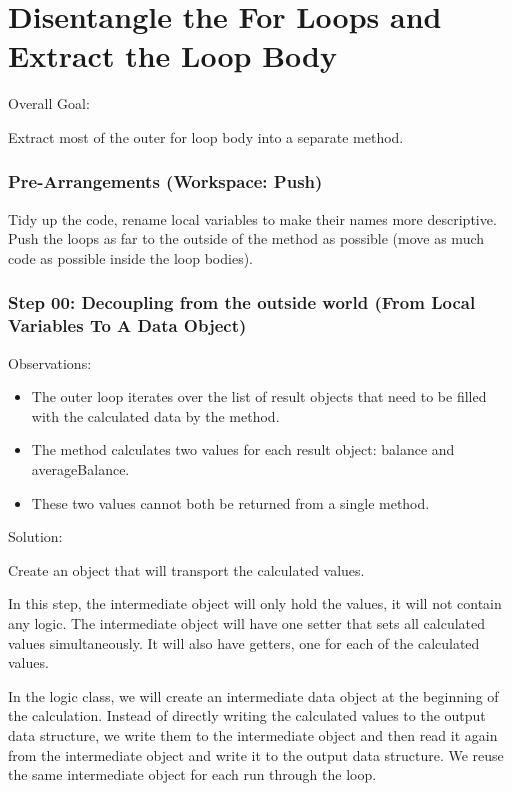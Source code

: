 \documentclass[a4paper,fleqn,titlepage,11pt]{article}
\begin{document}
\part{Disentangle the For Loops and Extract the Loop Body}

Overall Goal:

Extract most of the outer for loop body into a separate method.

\section*{Pre-Arrangements (Workspace: Push)}

Tidy up the code, rename local variables to make their names more descriptive.
Push the loops as far to the outside of the method as possible (move as much code as possible inside the loop bodies).

\section*{Step 00: Decoupling from the outside world (From Local Variables To A Data Object)}

Observations:
\begin{itemize}
\item The outer loop iterates over the list of result objects that need to be filled with the calculated data by the method.
\item The method calculates two values for each result object: balance and averageBalance. 
\item These two values cannot both be returned from a single method.
\end{itemize}

Solution:

Create an object that will transport the calculated values. 

In this step, the intermediate object will only hold the values, it will not contain any logic. The intermediate object will have one setter that sets all calculated values simultaneously. It will also have getters, one for each of the calculated values.

In the logic class, we will create an intermediate data object at the beginning of the calculation. Instead of directly writing the calculated values to the output data structure, we write them to the intermediate object and then read it again from the intermediate object and write it to the output data structure. We reuse the same intermediate object for each run through the loop.
\end{document}
